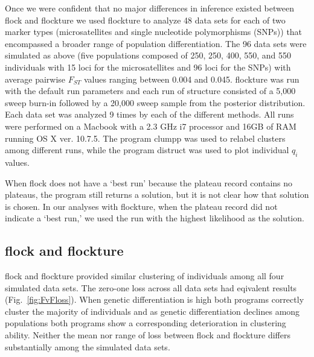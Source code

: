 Once we were confident that no major differences in inference existed between 
{\sc flock} and {\sc flockture} we used {\sc flockture} to analyze 48 data sets for each of two marker types 
(microsatellites and single nucleotide polymorphisms (SNPs))  that encompassed a broader range
of population differentiation. The 96 data sets were simulated as above (five populations 
composed of 250, 250, 400, 550, and 550 individuals with 15 loci for the microsatellites
and 96 loci for the SNPs)
with average pairwise $F_{ST}$ values ranging between 0.004 and 0.045. 
 {\sc flockture} was run with the default run parameters and each run of 
{\sc structure} consisted of a 5,000 sweep burn-in followed by a 20,000 sweep sample
from the posterior distribution. Each data set was analyzed 9 times by each of the different
methods. All runs were performed on a Macbook with a 2.3 GHz i7 processor
and 16GB of RAM running OS X ver. 10.7.5. The program {\sc clumpp} \citep{Jak&Ros2007} 
was used to relabel clusters among different runs,
while the program {\sc distruct} \citep{Rosenberg2004} was used to plot individual \textit{$q_i$} values.

When {\sc flock} does not have a `best run' because the plateau record contains no plateaus, the program still returns a solution, but it is not clear how that solution is chosen.  In
our analyses  with {\sc flockture}, when the plateau record did not indicate a `best run,' we used the
run with the highest likelihood as the solution.

\subsection*{{\sc flock} and {\sc flockture}} 
{\sc flock} and {\sc flockture} provided similar clustering of individuals among all four 
simulated data sets. The zero-one loss across all data sets had eqivalent results (Fig.~\ref{fig:FvFloss}).
When genetic differentiation is high both programs correctly cluster the majority of individuals and 
as genetic differentiation declines among populations both programs show a corresponding deterioration in 
clustering ability. Neither the mean nor range of loss between {\sc flock} and {\sc flockture} differs
substantially among the simulated data sets.  

